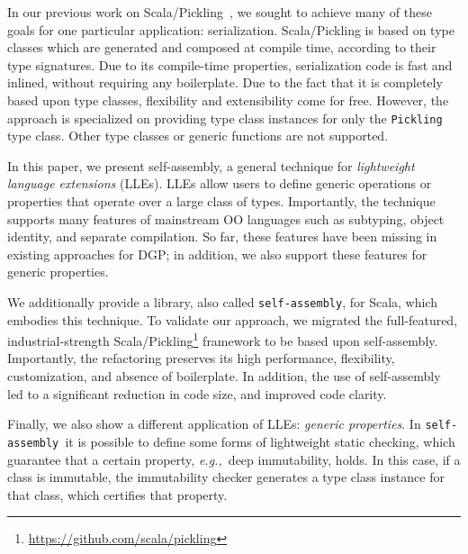 \documentclass[preprint,nocopyrightspace]{sigplanconf}
\newcommand{\eg}{{\em e.g.,~}}
\newcommand{\selfassembly}{\texttt{self-assembly~}}
\newcommand{\sselfassembly}{\texttt{self-assembly}}
\begin{document}
In our previous work on Scala/Pickling~\cite{Pickling}, we sought to achieve
many of these goals for one particular application: serialization.
Scala/Pickling is based on type classes which are generated and
composed at compile time, according to their type signatures.
Due to its compile-time properties, serialization code is fast and
inlined, without requiring any boilerplate. Due to the fact that it is
completely based upon type classes, flexibility and extensibility come for
free. However, the approach is specialized on providing type class instances
for only the \verb|Pickling| type class. Other type classes or generic
functions are not supported.

In this paper, we present self-assembly, a general technique for
\emph{lightweight language extensions} (LLEs). LLEs allow users to define
generic operations or properties that operate over a large class of types.
Importantly, the technique supports many features of mainstream OO languages
such as subtyping, object identity, and separate compilation. So far, these
features have been missing in existing approaches for DGP; in addition, we
also support these features for generic properties.

We additionally provide a library, also called \sselfassembly, for Scala, which
embodies this technique. To validate our approach, we migrated the full-featured,
industrial-strength Scala/Pickling\footnote{\url{https://github.com/scala/pickling}} framework to be based
upon self-assembly. Importantly, the refactoring preserves its high
performance, flexibility, customization, and absence of boilerplate. In
addition, the use of self-assembly led to a significant reduction in code
size, and improved code clarity.

Finally, we also show a different application of LLEs: \emph{generic
properties}. In \selfassembly it is possible to define some forms of lightweight static
checking, which guarantee that a certain property, \eg deep
immutability, holds. In this case, if a class is immutable, the immutability
checker generates a type class instance for that class, which certifies that
property.
\end{document}
